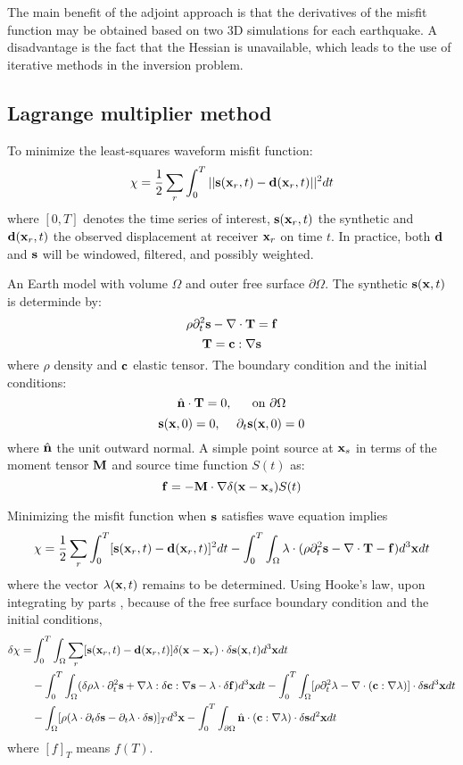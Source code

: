 The main benefit of the adjoint approach is that the \Frechet derivatives of the misfit function
may be obtained based on two 3D simulations for each earthquake.
A disadvantage is the fact that the Hessian is unavailable,
which leads to the use of iterative methods in the inversion problem.

\subsection{Lagrange multiplier method}
To minimize the least-squares waveform misfit function:
\[ \chi=\frac{1}{2}\sum_r\int_0^T||\mathbf{s}(\mathbf{x}_r,t)-\mathbf{d}(\mathbf{x}_r,t)||^2dt \]
where $[0,T]$ denotes the time series of interest, $\mathbf{s}(\mathbf{x}_r,t)$ the synthetic
and $\mathbf{d}(\mathbf{x}_r,t)$ the observed displacement at receiver $\mathbf{x}_r$ on time $t$.
In practice, both $\mathbf{d}$ and $\mathbf{s}$ will be windowed, filtered, and possibly weighted.

An Earth model with volume $\Omega$ and outer free surface $\partial\Omega$.
The synthetic $\mathbf{s}(\mathbf{x},t)$ is determinde by:
\[ \rho\partial_t^2\mathbf{s}-\nabla\cdot\mathbf{T}=\mathbf{f} \]
\[ \mathbf{T}=\mathbf{c}:\nabla\mathbf{s} \]
where $\rho$ density and $\mathbf{c}$ elastic tensor.
The boundary condition and the initial conditions:
\[ \hat{\mathbf{n}}\cdot\mathbf{T}=0 \text{,\hspace{5mm} on } \partial\Omega \]
\[ \mathbf{s}(\mathbf{x},0)=0 \text{,\hspace{5mm}} \partial_t\mathbf{s}(\mathbf{x},0)=0 \]
where $\hat{\mathbf{n}}$ the unit outward normal.
A simple point source at $\mathbf{x}_s$ in terms of the moment tensor $\mathbf{M}$
and source time function $S(t)$ as:
\[ \mathbf{f}=-\mathbf{M}\cdot\nabla\delta(\mathbf{x}-\mathbf{x}_s)S(t) \]

Minimizing the misfit function when $\mathbf{s}$ satisfies wave equation implies
\[ \chi=\frac{1}{2}\sum_r\int_0^T[\mathbf{s}(\mathbf{x}_r,t)-\mathbf{d}(\mathbf{x}_r,t)]^2dt-\int_0^T\int_\Omega\lambda\cdot(\rho\partial_t^2\mathbf{s}-\nabla\cdot\mathbf{T}-\mathbf{f})d^3\mathbf{x}dt \]
where the vector  $\lambda(\mathbf{x},t)$ remains to be determined.
Using Hooke's law, upon integrating by parts
,
because of the free surface boundary condition and the initial conditions,
\begin{align*}
  \delta\chi= & \int_0^T\int_\Omega\sum_r[\mathbf{s}(\mathbf{x}_r,t)-\mathbf{d}(\mathbf{x}_r,t)]\delta(\mathbf{x}-\mathbf{x}_r)\cdot\delta\mathbf{s}(\mathbf{x},t)d^3\mathbf{x}dt \\
  & -\int_0^T\int_\Omega(\delta\rho\lambda\cdot\partial_t^2\mathbf{s}+\nabla\lambda:\delta\mathbf{c}:\nabla\mathbf{s}-\lambda\cdot\delta\mathbf{f})d^3\mathbf{x}dt-\int_0^T\int_\Omega[\rho\partial_t^2\lambda-\nabla\cdot(\mathbf{c}:\nabla\lambda)]\cdot\delta\mathbf{s}d^3\mathbf{x}dt \\
  & -\int_\Omega[\rho(\lambda\cdot\partial_t\delta\mathbf{s}-\partial_t\lambda\cdot\delta\mathbf{s})]_Td^3\mathbf{x}-\int_0^T\int_{\partial\Omega}\hat{\mathbf{n}}\cdot(\mathbf{c}:\nabla\lambda)\cdot\delta\mathbf{s}d^2\mathbf{x}dt
\end{align*}
where $[f]_T$ means $f(T)$.

